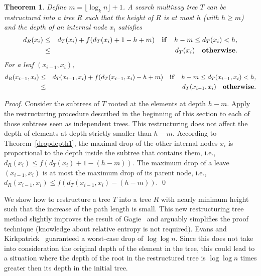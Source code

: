 \documentclass{llncs}\usepackage[english]{babel}
\newtheorem{thm}{Theorem}
\begin{document}
\begin{thm}
\label{dropdepthh}
Define $m=\lfloor \log_{k}  n \rfloor+1$. A search multiway tree $T$ can be restructured into a tree $R$ such that the height of $R$ is at most $h$ (with $h\geq m$) and the depth of an internal node $x_i$ satisfies 
\begin{eqnarray*}
d_R(x_i)&\leq& d_T(x_i)+ f(d_T(x_i)+1-h+m) \quad {\bf if} \quad h-m\leq d_T(x_i)<h,\\
                &\leq& d_T(x_i) \quad  {\bf otherwise}. 
\end{eqnarray*}
For a leaf $(x_{i-1},x_i)$, 
\begin{eqnarray*}
d_R(x_{i-1},x_i)&\leq&  d_T(x_{i-1},x_i)+f(d_T(x_{i-1},x_i)-h+m) \quad {\bf if} \quad h-m\leq d_T(x_{i-1},x_i)<h,\\
                &\leq& d_T(x_{i-1},x_i) \quad  {\bf otherwise}. 
\end{eqnarray*}

\end{thm}
\begin{proof}
Consider the subtrees of $T$ rooted at the elements at depth $h-m$. Apply the restructuring procedure described in the beginning of this section to each of those subtrees seen as independent trees. This restructuring does not affect the depth of elements at depth strictly smaller than $h-m$. According to Theorem~\ref{dropdepth1}, the maximal drop of the other internal nodes $x_i$ is proportional to the depth inside the subtree that contains them, i.e., $d_R(x_i)\leq f(d_T(x_i)+1-(h-m))$. The maximum drop of a leave $(x_{i-1},x_i)$ is at most the maximum drop of its parent node, i.e., $d_R(x_{i-1},x_i)\leq f(d_T(x_{i-1},x_i)-(h-m))$.
\qed \end{proof}

We show how to restructure a tree $T$ into a tree $R$ with nearly minimum height such that the increase of the path length is small. This new restructuring tree method slightly improves the result of Gagie~\cite{Gagie} and arguably simplifies the proof technique (knowledge about relative entropy is not required). Evans and Kirkpatrick~\cite{restructuringordered} guaranteed a worst-case drop of $\log\log n$. Since this does not take into consideration the original depth of the element in the tree, this could lead to a situation where the depth of the root in the restructured tree is $\log\log n$ times greater then its depth in the initial tree. 
\end{document}
